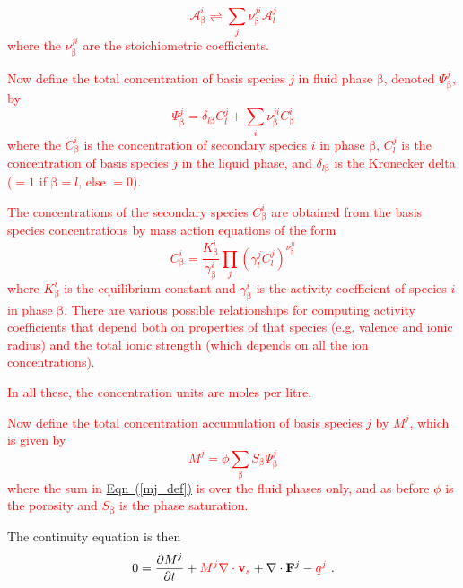 \documentclass[12pt]{report}
\def\phase{\mathrm{\beta}}
\def\flux{\mathbf{F}}
\begin{document}
\textcolor{red}{
\begin{equation}
  \mathcal{A}_{\phase}^{i} \rightleftharpoons \sum_{j} \nu_{\phase}^{ji} \mathcal{A}_{l}^{j}
\end{equation}
where the $\nu_{\phase}^{ji}$ are the stoichiometric coefficients.
}

\textcolor{red}{
Now define the total concentration of basis species $j$ in fluid phase
$\phase$, denoted $\Psi_{\phase}^{j}$, by
\begin{equation}
  \Psi_{\phase}^{j}=\delta_{l \phase} C_{l}^{j}+ \sum_{i}
  \nu_{\phase}^{ji} C_{\phase}^{i}
\end{equation}
where the $C_{\phase}^{i}$ is the concentration of secondary species
$i$ in phase $\phase$,  $C_{l}^{j}$ is the concentration of basis
species $j$ in the liquid phase, and $\delta_{l \phase}$ is the
Kronecker delta ($=1$ if $\phase = l$, else $=0$).
}

\textcolor{red}{
The concentrations of the secondary species $C_{\phase}^{i}$ are
obtained from the basis species concentrations by mass action
equations of the form
\begin{equation}
  C_{\phase}^{i} = \frac{K_{\phase}^{i}}{\gamma_{\phase}^{i}}
  \prod_{j} (\gamma_{l}^{j} C_{l}^{j})^{\nu_{\phase}^{j i}}
\end{equation}
where $K_{\phase}^{i}$ is the equilibrium constant and
$\gamma_{\phase}^{i}$ is the activity coefficient of species $i$ in
phase $\phase$. There are various possible relationships for computing
activity coefficients that depend both on properties of that species
(e.g. valence and ionic radius) and the total ionic strength (which
depends on all the ion concentrations).
}

\textcolor{red}{
In all these, the concentration units are moles per litre.
}

\textcolor{red}{
Now define the total concentration accumulation of basis species $j$
by $M^{j}$, which is given by
\begin{equation}
  \label{mj_def}
  M^{j}=\phi \sum_{\phase} S_{\phase} \Psi^{j}_{\phase}
\end{equation}
where the sum in \hyperref[mj_def]{Eqn~(\ref*{mj_def})} is over the
fluid phases only, and as before $\phi$ is the porosity and
$S_{\phase}$ is the phase saturation.  }

The continuity equation is then
\begin{equation}
0 = \frac{\partial M^{j}}{\partial t} + \textcolor{red}{M^{j}\nabla\cdot{\mathbf
  v}_{s}} + \nabla\cdot \flux^{j} - \textcolor{red}{q^{j}} \ .
\label{chemistry_continuity}
\end{equation}
\end{document}
